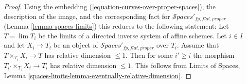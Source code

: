 \documentclass{stacks-project}
\theoremstyle{plain}
\theoremstyle{definition}
\theoremstyle{remark}
\numberwithin{equation}{subsection}
\def\lim{\mathop{\mathrm{lim}}\nolimits}
\def\Spacesstack{\mathcal{S}\!\mathit{paces}}
\begin{document}
\begin{proof}
Using the embedding (\ref{equation-curves-over-proper-spaces}),
the description of the image, and
the corresponding fact for $\Spacesstack'_{fp, flat, proper}$
(Lemma \ref{lemma-spaces-limits})
this reduces to the following statement:
Let $T = \lim T_i$ be the limits of a
directed inverse system of affine schemes.
Let $i \in I$ and let $X_i \to T_i$ be an object of
$\Spacesstack'_{fp, flat, proper}$ over $T_i$.
Assume that $T \times_{T_i} X_i \to T$ has
relative dimension $\leq 1$.
Then for some $i' \geq i$ the morphism
$T_{i'} \times_{T_i} X_i \to T_i$ has
relative dimension $\leq 1$. This follows from
Limits of Spaces, Lemma
\ref{spaces-limits-lemma-eventually-relative-dimension}.
\end{proof}
\end{document}
